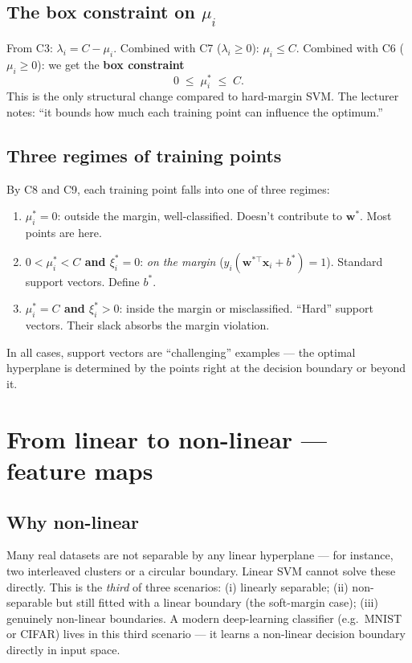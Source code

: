\documentclass[11pt, a4paper]{article}
\begin{document}
\subsection{\texorpdfstring{The box constraint on $\mu_i$}{The box constraint on mu\_i}}

From C3: $\lambda_i = C - \mu_i$. Combined with C7 ($\lambda_i \ge 0$): $\mu_i \le C$. Combined with C6 ($\mu_i \ge 0$): we get the \textbf{box constraint}
\[
\boxed{\;0 \;\le\; \mu_i^* \;\le\; C.\;}
\]
This is the only structural change compared to hard-margin SVM. The lecturer notes: ``it bounds how much each training point can influence the optimum.''

\subsection{Three regimes of training points}

By C8 and C9, each training point falls into one of three regimes:
\begin{enumerate}
  \item \textbf{$\mu_i^* = 0$}: outside the margin, well-classified. Doesn't contribute to $\mathbf{w}^*$. Most points are here.
  \item \textbf{$0 < \mu_i^* < C$ and $\xi_i^* = 0$}: \emph{on the margin} ($y_i(\mathbf{w}^{*\top}\mathbf{x}_i + b^*) = 1$). Standard support vectors. Define $b^*$.
  \item \textbf{$\mu_i^* = C$ and $\xi_i^* > 0$}: inside the margin or misclassified. ``Hard'' support vectors. Their slack absorbs the margin violation.
\end{enumerate}

In all cases, support vectors are ``challenging'' examples — the optimal hyperplane is determined by the points right at the decision boundary or beyond it.

\section{From linear to non-linear --- feature maps}

\subsection{Why non-linear}

Many real datasets are not separable by any linear hyperplane — for instance, two interleaved clusters or a circular boundary. Linear SVM cannot solve these directly. This is the \emph{third} of three scenarios: (i) linearly separable; (ii) non-separable but still fitted with a linear boundary (the soft-margin case); (iii) genuinely non-linear boundaries. A modern deep-learning classifier (e.g.\ MNIST or CIFAR) lives in this third scenario — it learns a non-linear decision boundary directly in input space.
\end{document}
